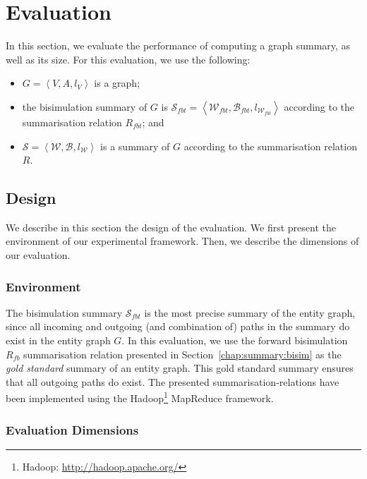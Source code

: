 \section{Evaluation}
\label{sec:summary:eval}

In this section, we evaluate the performance of computing a graph summary, as well as its size.
For this evaluation, we use the following:
\begin{itemize}
	\item $G=\left\langle V, A, l_V \right\rangle$ is a graph;
	\item the bisimulation summary of $G$ is $\mathcal{S}_{fbt} = \left\langle \mathcal{W}_{fbt}, \mathcal{B}_{fbt}, l_{\mathcal{W}_{fbt}} \right\rangle$ according to the summarisation relation $R_{fbt}$; and
	\item $\mathcal{S} = \left\langle \mathcal{W}, \mathcal{B}, l_{\mathcal{W}} \right\rangle$ is a summary of $G$ according to the summarisation relation $R$.
\end{itemize}

\subsection{Design}
\label{sec:eval:design}

We describe in this section the design of the evaluation. We first present the environment of our experimental framework. Then, we describe the dimensions of our evaluation.

\subsubsection{Environment}

The bisimulation summary $\mathcal{S}_{fbt}$ is the most precise summary of the entity graph, since all incoming and outgoing (and combination of) paths in the summary do exist in the entity graph $G$. In this evaluation, we use the forward bisimulation $R_{fb}$ summarisation relation presented in Section~\ref{chap:summary:bisim} as the \emph{gold standard} summary of an entity graph. This gold standard summary ensures that all outgoing paths do exist. The presented \glspl{summarisation-relation} have been implemented using the Hadoop\footnote{Hadoop: \url{http://hadoop.apache.org/}} MapReduce framework.

\subsubsection{Evaluation Dimensions}

